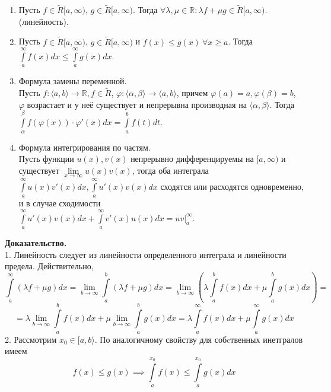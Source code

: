 \begin{enumerate}

\item Пусть $f\in \tilde R[a,\infty)$, $g\in \tilde R[a,\infty)$.
Тогда  
$\forall \lambda,\mu\in \mathbb{R}:\lambda f+\mu g\in \tilde R[a,\infty)$.
(линейность).

\item Пусть $f\in \tilde R[a,\infty)$,  $g\in \tilde R[a,\infty)$ и
    $f(x)\leqslant g(x)~\forall x\geqslant a$. Тогда
    $\int\limits_{a}^{\infty}f(x)dx\leqslant \int\limits_{a}^{\infty}g(x)dx$.

\item Формула замены переменной.\\
    Пусть $f\colon\langle a,b \rangle\to \mathbb{R},f\in \tilde R$, 
    $\varphi\colon\langle \alpha,\beta\rangle\to\langle a,b\rangle$,
    причем $\varphi(a)=a,\varphi(\beta)=b$, $\varphi$ возрастает и у неё 
    существует и непрерывна производная на $\langle\alpha,\beta\rangle$.
    Тогда $\int\limits_{\alpha}^{\beta}f(\varphi(x))\cdot \varphi'(x)dx=
    \int\limits_{a}^{b} f(t)dt$.


\item Формула интегрирования по частям.\\
    Пусть функции $u(x),v(x)$ непрерывно дифференцируемы на $[a,\infty)$ и 
    существует $\lim\limits_{x \to \infty}u(x)v(x)$, тогда оба интеграла
    $\int\limits_{a}^{\infty}u(x)v'(x)dx,\int\limits_{a}^{\infty}
    u'(x)v(x)dx$ сходятся или расходятся одновременно, и в случае 
    сходимости\\
    $ \int\limits_{a}^{\infty}u'(x)v(x)dx+\int\limits_{a}^{\infty}v'(x)u(x)dx=
    uv\Big|^\infty_a$.


\end{enumerate}
\textbf{Доказательство.}\\
1. Линейность следует из линейности определенного интеграла и линейности
предела. Действительно,
$$\int\limits_{a}^{\infty}(\lambda f+\mu g)dx = 
\lim\limits_{b \to \infty} \int\limits_{a}^{b} (\lambda f+\mu g)dx = 
\lim\limits_{b \to \infty} \left(\lambda \int\limits_{a}^{b}f(x)dx + \mu
\int\limits_{a}^{b} g(x)dx\right) =
$$ 
$$ = \lambda \lim\limits_{b \to \infty} \int\limits_{a}^{b} f(x)dx + 
\mu \lim\limits_{b \to \infty} \int\limits_{a}^{b} g(x)dx = 
\lambda \int\limits_{a}^{\infty}f(x) dx + \mu \int\limits_{a}^{\infty}g(x)dx
$$
2. Рассмотрим $x_0\in [a,b\rangle$. По аналогичному свойству для
собcтвенных инетгралов имеем
$$f(x)\leqslant g(x)\implies \int\limits_{a}^{x_0}f(x)\leqslant    
\int\limits_{a}^{x_0}g(x)dx$$ 
